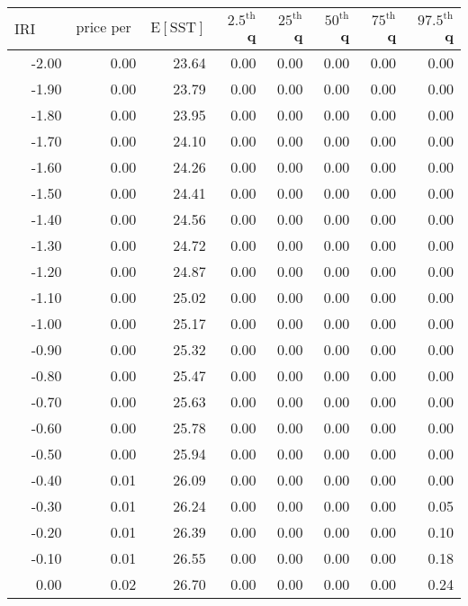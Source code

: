 \begin{table*}[ht]
\centering \footnotesize
\begin{tabular}{rrrrrrrr}
  \hline
$\mbox{IRI anom}$ & $\mbox{price per USD}$ & $\mbox{E}[\mbox{SST}]$ & $2.5^{\mbox{th}}$ q & $25^{\mbox{th}}$ q & $50^{\mbox{th}}$ q & $75^{\mbox{th}}$ q & $97.5^{\mbox{th}}$ q \\ 
  \hline
-2.00 & 0.00 & 23.64 & 0.00 & 0.00 & 0.00 & 0.00 & 0.00 \\ 
  -1.90 & 0.00 & 23.79 & 0.00 & 0.00 & 0.00 & 0.00 & 0.00 \\ 
  -1.80 & 0.00 & 23.95 & 0.00 & 0.00 & 0.00 & 0.00 & 0.00 \\ 
  -1.70 & 0.00 & 24.10 & 0.00 & 0.00 & 0.00 & 0.00 & 0.00 \\ 
  -1.60 & 0.00 & 24.26 & 0.00 & 0.00 & 0.00 & 0.00 & 0.00 \\ 
  -1.50 & 0.00 & 24.41 & 0.00 & 0.00 & 0.00 & 0.00 & 0.00 \\ 
  -1.40 & 0.00 & 24.56 & 0.00 & 0.00 & 0.00 & 0.00 & 0.00 \\ 
  -1.30 & 0.00 & 24.72 & 0.00 & 0.00 & 0.00 & 0.00 & 0.00 \\ 
  -1.20 & 0.00 & 24.87 & 0.00 & 0.00 & 0.00 & 0.00 & 0.00 \\ 
  -1.10 & 0.00 & 25.02 & 0.00 & 0.00 & 0.00 & 0.00 & 0.00 \\ 
  -1.00 & 0.00 & 25.17 & 0.00 & 0.00 & 0.00 & 0.00 & 0.00 \\ 
  -0.90 & 0.00 & 25.32 & 0.00 & 0.00 & 0.00 & 0.00 & 0.00 \\ 
  -0.80 & 0.00 & 25.47 & 0.00 & 0.00 & 0.00 & 0.00 & 0.00 \\ 
  -0.70 & 0.00 & 25.63 & 0.00 & 0.00 & 0.00 & 0.00 & 0.00 \\ 
  -0.60 & 0.00 & 25.78 & 0.00 & 0.00 & 0.00 & 0.00 & 0.00 \\ 
  -0.50 & 0.00 & 25.94 & 0.00 & 0.00 & 0.00 & 0.00 & 0.00 \\ 
  -0.40 & 0.01 & 26.09 & 0.00 & 0.00 & 0.00 & 0.00 & 0.00 \\ 
  -0.30 & 0.01 & 26.24 & 0.00 & 0.00 & 0.00 & 0.00 & 0.05 \\ 
  -0.20 & 0.01 & 26.39 & 0.00 & 0.00 & 0.00 & 0.00 & 0.10 \\ 
  -0.10 & 0.01 & 26.55 & 0.00 & 0.00 & 0.00 & 0.00 & 0.18 \\ 
  0.00 & 0.02 & 26.70 & 0.00 & 0.00 & 0.00 & 0.00 & 0.24 \\ 

\end{tabular}
\end{table*}
